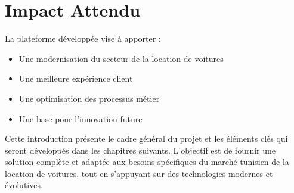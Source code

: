 \section*{Impact Attendu}
La plateforme développée vise à apporter :
\begin{itemize}
    \item Une modernisation du secteur de la location de voitures
    \item Une meilleure expérience client
    \item Une optimisation des processus métier
    \item Une base pour l'innovation future
\end{itemize}

Cette introduction présente le cadre général du projet et les éléments clés qui seront développés dans les chapitres suivants. L'objectif est de fournir une solution complète et adaptée aux besoins spécifiques du marché tunisien de la location de voitures, tout en s'appuyant sur des technologies modernes et évolutives.




